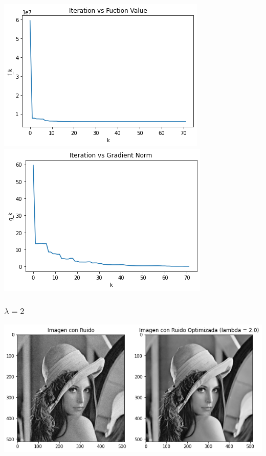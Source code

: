 \documentclass[11pt,letterpaper]{article}
\theoremstyle{definition}
\theoremstyle{definition}
\theoremstyle{definition}
\begin{document}
\begin{center}
	\includegraphics[width=0.6\linewidth]{graficas/hs/funcion_1}
	\includegraphics[width=0.6\linewidth]{graficas/hs/gradiente_1}
\end{center}

\subsubsection{$ \lambda = 2 $}
\begin{center}
	\includegraphics[width=0.75\linewidth]{graficas/hs/optimizada_2}
\end{center}
\end{document}
